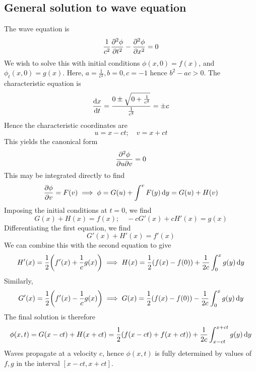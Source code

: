 \subsection{General solution to wave equation}
The wave equation is
\[
	\frac{1}{c^2} \pdv[2]{\phi}{t} - \pdv[2]{\phi}{x} = 0
\]
We wish to solve this with initial conditions \( \phi(x,0) = f(x) \), and \( \phi_t(x,0) = g(x) \).
Here, \( a = \frac{1}{c^2}, b = 0, c = -1 \) hence \( b^2 - ac > 0 \).
The characteristic equation is
\[
	\dv{x}{t} = \frac{0 \pm \sqrt{0 + \frac{1}{c^2}}}{\frac{1}{c^2}} = \pm c
\]
Hence the characteristic coordinates are
\[
	u = x - ct;\quad v = x + ct
\]
This yields the canonical form
\[
	\pdv{\phi}{u}{v} = 0
\]
This may be integrated directly to find
\[
	\pdv{\phi}{v} = F(v) \implies \phi = G(u) + \int^v F(y) \dd{y} = G(u) + H(v)
\]
Imposing the initial conditions at \( t = 0 \), we find
\[
	G(x) + H(x) = f(x);\quad -cG'(x) + cH'(x) = g(x)
\]
Differentiating the first equation, we find
\[
	G'(x) + H'(x) = f'(x)
\]
We can combine this with the second equation to give
\[
	H'(x) = \frac{1}{2} \qty(f'(x) + \frac{1}{c}g(x)) \implies H(x) = \frac{1}{2} \qty(f(x) - f(0)) + \frac{1}{2c}\int_0^x g(y) \dd{y}
\]
Similarly,
\[
	G'(x) = \frac{1}{2} \qty(f'(x) - \frac{1}{c}g(x)) \implies G(x) = \frac{1}{2} \qty(f(x) - f(0)) - \frac{1}{2c}\int_0^x g(y) \dd{y}
\]
The final solution is therefore
\[
	\phi(x,t) = G(x-ct) + H(x+ct) = \frac{1}{2}\qty(f(x-ct) + f(x+ct)) + \frac{1}{2c} \int_{x-ct}^{x+ct} g(y) \dd{y}
\]
Waves propagate at a velocity \( c \), hence \( \phi(x,t) \) is fully determined by values of \( f, g \) in the interval \( [x-ct, x+ct] \).
